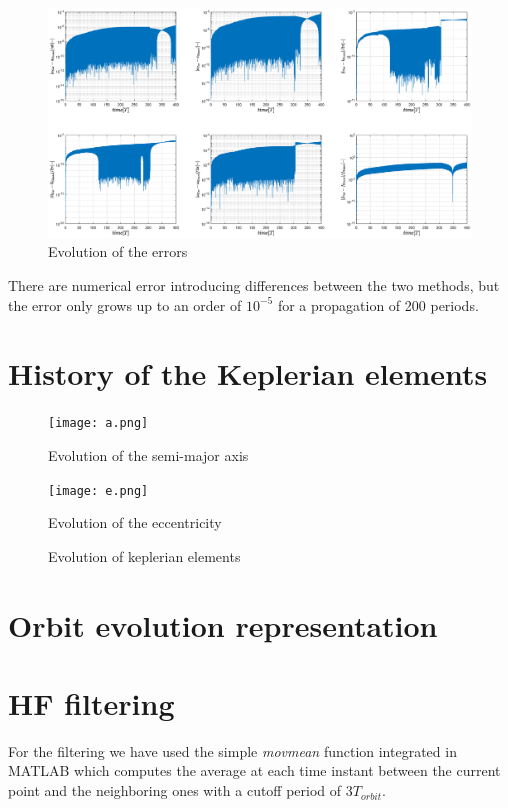 \documentclass[11pt,a4paper]{report}
\begin{document}
\begin{figure}[]
    \centering
    \includegraphics[width=1.5\textwidth]{400_T_error.eps}
    \caption{Evolution of the errors}
\end{figure}

\par
There are numerical error introducing differences between the two methods, but the error only grows up to an order of $10^{-5}$ for a propagation of 200 periods.


\section{History of the Keplerian elements}
\begin{figure}[H]
    \centering
    \texttt{[image: a.png]}
    \caption{Evolution of the semi-major axis}
    \end{figure}

\begin{figure}[H]
    \centering
    \texttt{[image: e.png]}
    \caption{Evolution of the eccentricity}
    \end{figure}


\begin{figure}[H]
    \centering
    \caption{Evolution of keplerian elements}
    \end{figure}

\section{Orbit evolution representation}

\section{HF filtering}
For the filtering we have used the simple \emph{movmean} function integrated in MATLAB which computes the average at each time instant between the current point and the neighboring ones with a cutoff period of $3T_{orbit}$.
\end{document}
